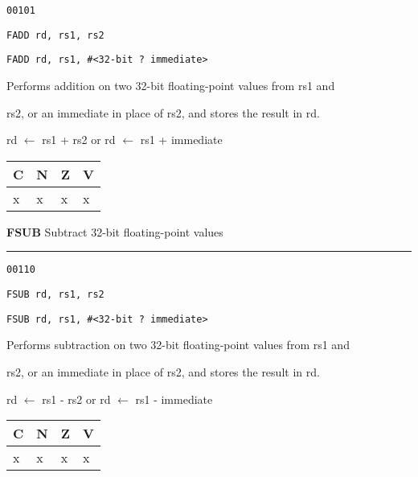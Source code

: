 \documentclass{article}
\begin{document}
{\large
	 \texttt{00101} \par
	\smallbreak
	 \texttt{FADD rd, rs1, rs2} \par
	\smallbreak
	 \texttt{FADD rd, rs1, \#<32-bit ? immediate>} \par
	\smallbreak
	 Performs addition on two 32-bit floating-point values from rs1 and \par
	\makebox[3.5cm][l]{  } rs2, or an immediate in place of rs2, and stores the result in rd. \par
	\smallbreak
	 rd $\leftarrow$ rs1 + rs2 \quad or \quad rd $\leftarrow$ rs1 + immediate\par
	\smallbreak
	 \begin{tabular}{llll} C \quad & N \quad & Z \quad & V \\ \hline x & x & x & x \\ \end{tabular}
}

\bigskip\bigskip

\flushleft
\LARGE\textbf{FSUB} \large \hfill Subtract 32-bit floating-point values

\kern-3pt
\noindent\rule{16.5cm}{0.4pt}
\normalsize

{\large
	 \texttt{00110} \par
	\smallbreak
	 \texttt{FSUB rd, rs1, rs2} \par
	\smallbreak
	 \texttt{FSUB rd, rs1, \#<32-bit ? immediate>} \par
	\smallbreak
	 Performs subtraction on two 32-bit floating-point values from rs1 and \par
	\makebox[3.5cm][l]{  } rs2, or an immediate in place of rs2, and stores the result in rd. \par
	\smallbreak
	 rd $\leftarrow$ rs1 - rs2 \quad or \quad rd $\leftarrow$ rs1 - immediate\par
	\smallbreak
	 \begin{tabular}{llll} C \quad & N \quad & Z \quad & V \\ \hline x & x & x & x \\ \end{tabular}
}
\end{document}
